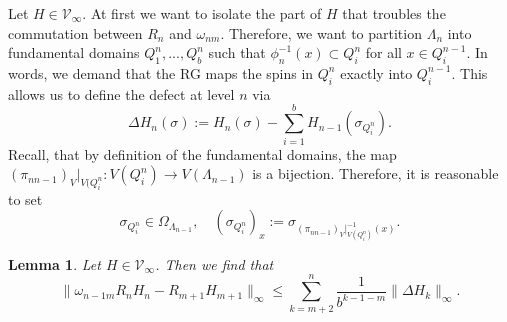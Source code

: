\documentclass{article}
\newtheorem{lemma}[theorem]{Lemma}
\begin{document}
Let $H\in \mathcal{V}_\infty$. At first we want to isolate the part of $H$ that troubles the commutation between $R_n$ and $\omega_{nm}$. Therefore, we want to partition $\Lambda_n$ into fundamental domains $Q_1^{n},...,Q_b^{n}$ such that $\phi_n^{-1}(x)\subset Q_i^n$ for all $x\in Q_i^{n-1}$. In words, we demand that the RG maps the spins in $Q_i^n$ exactly into $Q_i^{n-1}$. This allows us to define the defect at level $n$ via
\begin{equation}\label{Eq3}
    \Delta H_n(\sigma):=H_n(\sigma)-\sum_{i=1}^bH_{n-1}(\sigma_{Q_i^n}).
\end{equation}
Recall, that by definition of the fundamental domains, the map $(\pi_{nn-1})_V|_{V(Q_i^n}:V(Q_i^n)\to V(\Lambda_{n-1})$ is a bijection. Therefore, it is reasonable to set
\begin{equation}
    \sigma_{Q_i^n}\in \Omega_{\Lambda_{n-1}},\quad (\sigma_{Q_i^n})_x:=\sigma_{(\pi_{nn-1})_V|_{V(Q_i^n)}^{-1}(x)}.
\end{equation}

\begin{lemma}\label{Lem4}
    Let $H\in\mathcal{V}_\infty$. Then we find that
    \begin{equation}
        \|\omega_{n-1m}R_nH_n-R_{m+1}H_{m+1}\|_\infty\leq\sum_{k=m+2}^n\frac{1}{b^{k-1-m}}\|\Delta H_k\|_\infty.
    \end{equation}
\end{lemma}
\end{document}
